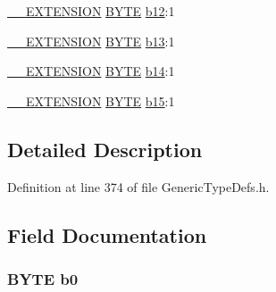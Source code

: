 \begin{DoxyCompactItemize}
\item 
\hyperlink{_generic_type_defs_8h_a6f634b0fdcc4febac630fc28e2685ddb}{\+\_\+\+\_\+\+E\+X\+T\+E\+N\+S\+I\+O\+N} \hyperlink{_generic_type_defs_8h_a4ae1dab0fb4b072a66584546209e7d58}{B\+Y\+T\+E} \hyperlink{struct_w_o_r_d___v_a_l_1_1_____p_a_c_k_e_d_a0734f72cc1a97c5f247c391f0865cb25}{b12}\+:1
\item 
\hyperlink{_generic_type_defs_8h_a6f634b0fdcc4febac630fc28e2685ddb}{\+\_\+\+\_\+\+E\+X\+T\+E\+N\+S\+I\+O\+N} \hyperlink{_generic_type_defs_8h_a4ae1dab0fb4b072a66584546209e7d58}{B\+Y\+T\+E} \hyperlink{struct_w_o_r_d___v_a_l_1_1_____p_a_c_k_e_d_ad80a06fb7513aebcec007b0e4604d7fc}{b13}\+:1
\item 
\hyperlink{_generic_type_defs_8h_a6f634b0fdcc4febac630fc28e2685ddb}{\+\_\+\+\_\+\+E\+X\+T\+E\+N\+S\+I\+O\+N} \hyperlink{_generic_type_defs_8h_a4ae1dab0fb4b072a66584546209e7d58}{B\+Y\+T\+E} \hyperlink{struct_w_o_r_d___v_a_l_1_1_____p_a_c_k_e_d_a35407ca1ca80639e1358d13411cf3588}{b14}\+:1
\item 
\hyperlink{_generic_type_defs_8h_a6f634b0fdcc4febac630fc28e2685ddb}{\+\_\+\+\_\+\+E\+X\+T\+E\+N\+S\+I\+O\+N} \hyperlink{_generic_type_defs_8h_a4ae1dab0fb4b072a66584546209e7d58}{B\+Y\+T\+E} \hyperlink{struct_w_o_r_d___v_a_l_1_1_____p_a_c_k_e_d_aa1923b88f595f468ae880420ff9a2d38}{b15}\+:1
\end{DoxyCompactItemize}


\subsection{Detailed Description}


Definition at line 374 of file Generic\+Type\+Defs.\+h.



\subsection{Field Documentation}
\hypertarget{struct_w_o_r_d___v_a_l_1_1_____p_a_c_k_e_d_a4010350907c88306a36c21694097c1ca}{}
\subsubsection[{b0}]{ {\bf B\+Y\+T\+E} b0}\label{struct_w_o_r_d___v_a_l_1_1_____p_a_c_k_e_d_a4010350907c88306a36c21694097c1ca}


